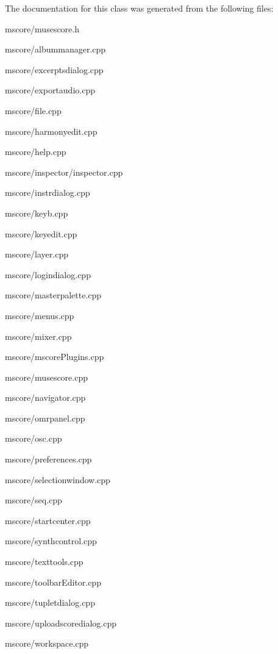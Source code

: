 The documentation for this class was generated from the following files\+:\begin{DoxyCompactItemize}
\item 
mscore/musescore.\+h\item 
mscore/albummanager.\+cpp\item 
mscore/excerptsdialog.\+cpp\item 
mscore/exportaudio.\+cpp\item 
mscore/file.\+cpp\item 
mscore/harmonyedit.\+cpp\item 
mscore/help.\+cpp\item 
mscore/inspector/inspector.\+cpp\item 
mscore/instrdialog.\+cpp\item 
mscore/keyb.\+cpp\item 
mscore/keyedit.\+cpp\item 
mscore/layer.\+cpp\item 
mscore/logindialog.\+cpp\item 
mscore/masterpalette.\+cpp\item 
mscore/menus.\+cpp\item 
mscore/mixer.\+cpp\item 
mscore/mscore\+Plugins.\+cpp\item 
mscore/musescore.\+cpp\item 
mscore/navigator.\+cpp\item 
mscore/omrpanel.\+cpp\item 
mscore/osc.\+cpp\item 
mscore/preferences.\+cpp\item 
mscore/selectionwindow.\+cpp\item 
mscore/seq.\+cpp\item 
mscore/startcenter.\+cpp\item 
mscore/synthcontrol.\+cpp\item 
mscore/texttools.\+cpp\item 
mscore/toolbar\+Editor.\+cpp\item 
mscore/tupletdialog.\+cpp\item 
mscore/uploadscoredialog.\+cpp\item 
mscore/workspace.\+cpp\end{DoxyCompactItemize}
